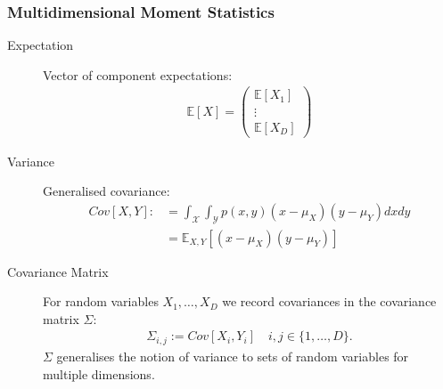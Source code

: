 \subsubsection{Multidimensional Moment Statistics}
\begin{description}
\item[Expectation] Vector of component expectations:
    \begin{align*}
        \mathbb E[X] = \begin{pmatrix}
                         \mathbb E[X_1]\\
                         \vdots\\
                         \mathbb E[X_D]
                       \end{pmatrix}
    \end{align*}
\item[Variance] Generalised covariance:
    \begin{align*}
        Cov[X,Y] :&= \int_{\mathcal X}\int_{\mathcal Y} p(x,y)(x-\mu_X)(y-\mu_Y) dxdy \\ 
        &=\mathbb E_{X,Y} [(x-\mu_X)(y-\mu_Y)]
    \end{align*}
\item[Covariance Matrix] For random variables $X_1, \ldots, X_D$ we record covariances in the covariance matrix $\Sigma$:
    \begin{align*}
        \Sigma_{i,j} := Cov[X_i,Y_i]\quad i,j \in \{1,\ldots, D\}.
    \end{align*}
    $\Sigma$ generalises the notion of variance to sets of random variables for multiple dimensions.

\end{description}


